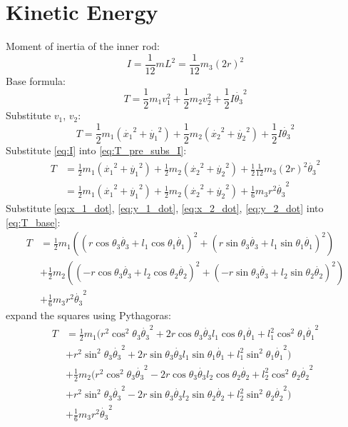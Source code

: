 \documentclass[titlepage]{article}
\numberwithin{equation}{section}
\begin{document}
\section{Kinetic Energy}
Moment of inertia of the inner rod:
\begin{equation} \label{eq:I}
I = \frac{1}{12} m L^2 = \frac{1}{12} m_3 (2 r)^2
\end{equation}
Base formula:
\begin{equation}
T = \frac{1}{2} m_1 v_1^2 + \frac{1}{2} m_2 v_2^2 + \frac{1}{2} I \dot{\theta_3}^2
\end{equation}
Substitute $v_1$, $v_2$:
\begin{equation} \label{eq:T_pre_subs_I}
T = \frac{1}{2} m_1 (\dot{x_1}^2 + \dot{y_1}^2) + \frac{1}{2} m_2 (\dot{x_2}^2 + \dot{y_2}^2) + \frac{1}{2} I \dot{\theta_3}^2
\end{equation}
Substitute \ref{eq:I} into \ref{eq:T_pre_subs_I}:
\begin{align}
T &= \frac{1}{2} m_1 (\dot{x_1}^2 + \dot{y_1}^2) + \frac{1}{2} m_2 (\dot{x_2}^2 + \dot{y_2}^2) + \frac{1}{2} \frac{1}{12} m_3 (2 r)^2 \dot{\theta_3}^2 \nonumber \\
&= \frac{1}{2} m_1 (\dot{x_1}^2 + \dot{y_1}^2) + \frac{1}{2} m_2 (\dot{x_2}^2 + \dot{y_2}^2) + \frac{1}{6} m_3 r^2 \dot{\theta_3}^2 \label{eq:T_base}
\end{align}
Substitute \ref{eq:x_1_dot}, \ref{eq:y_1_dot}, \ref{eq:x_2_dot}, \ref{eq:y_2_dot} into \ref{eq:T_base}:
\begin{align}
T &= \frac{1}{2} m_1 ((r \cos \theta_3 \dot{\theta_3} + l_1 \cos \theta_1 \dot{\theta_1})^2 + (r \sin \theta_3 \dot{\theta_3} + l_1 \sin \theta_1 \dot{\theta_1})^2) \nonumber \\
  &+ \frac{1}{2} m_2 ((-r \cos \theta_3 \dot{\theta_3} + l_2 \cos \theta_2 \dot{\theta_2})^2 + (-r \sin \theta_3 \dot{\theta_3} + l_2 \sin \theta_2 \dot{\theta_2})^2) \nonumber \\
  &+ \frac{1}{6} m_3 r^2 \dot{\theta_3}^2
\end{align}
expand the squares using Pythagoras:
\begin{align}
T &= \frac{1}{2} m_1 (r^2 \cos^2 \theta_3 \dot{\theta_3}^2 + 2 r \cos \theta_3 \dot{\theta_3} l_1 \cos \theta_1 \dot{\theta_1} + l_1^2 \cos^2 \theta_1 \dot{\theta_1}^2 \nonumber \\
  &+ r^2 \sin^2 \theta_3 \dot{\theta_3}^2 + 2 r \sin \theta_3 \dot{\theta_3} l_1 \sin \theta_1 \dot{\theta_1} + l_1^2 \sin^2 \theta_1 \dot{\theta_1}^2) \nonumber \\
  &+ \frac{1}{2} m_2 (r^2 \cos^2 \theta_3 \dot{\theta_3}^2 - 2 r \cos \theta_3 \dot{\theta_3} l_2 \cos \theta_2 \dot{\theta_2} + l_2^2 \cos^2 \theta_2 \dot{\theta_2}^2 \nonumber \\
  &+ r^2 \sin^2 \theta_3 \dot{\theta_3}^2 - 2 r \sin \theta_3 \dot{\theta_3} l_2 \sin \theta_2 \dot{\theta_2} + l_2^2 \sin^2 \theta_2 \dot{\theta_2}^2) \nonumber \\
  &+ \frac{1}{6} m_3 r^2 \dot{\theta_3}^2
\end{align}
\end{document}
